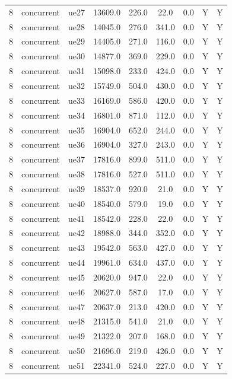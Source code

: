 \begin{table}[ht]
\begin{tabular}{|c|c|c|c|c|c|c|c|c|}
8 & concurrent & ue27 & 13609.0 & 226.0 & 22.0 & 0.0 & Y & Y \\
8 & concurrent & ue28 & 14045.0 & 276.0 & 341.0 & 0.0 & Y & Y \\
8 & concurrent & ue29 & 14405.0 & 271.0 & 116.0 & 0.0 & Y & Y \\
8 & concurrent & ue30 & 14877.0 & 369.0 & 229.0 & 0.0 & Y & Y \\
8 & concurrent & ue31 & 15098.0 & 233.0 & 424.0 & 0.0 & Y & Y \\
8 & concurrent & ue32 & 15749.0 & 504.0 & 430.0 & 0.0 & Y & Y \\
8 & concurrent & ue33 & 16169.0 & 586.0 & 420.0 & 0.0 & Y & Y \\
8 & concurrent & ue34 & 16801.0 & 871.0 & 112.0 & 0.0 & Y & Y \\
8 & concurrent & ue35 & 16904.0 & 652.0 & 244.0 & 0.0 & Y & Y \\
8 & concurrent & ue36 & 16904.0 & 327.0 & 243.0 & 0.0 & Y & Y \\
8 & concurrent & ue37 & 17816.0 & 899.0 & 511.0 & 0.0 & Y & Y \\
8 & concurrent & ue38 & 17816.0 & 527.0 & 511.0 & 0.0 & Y & Y \\
8 & concurrent & ue39 & 18537.0 & 920.0 & 21.0 & 0.0 & Y & Y \\
8 & concurrent & ue40 & 18540.0 & 579.0 & 19.0 & 0.0 & Y & Y \\
8 & concurrent & ue41 & 18542.0 & 228.0 & 22.0 & 0.0 & Y & Y \\
8 & concurrent & ue42 & 18988.0 & 344.0 & 352.0 & 0.0 & Y & Y \\
8 & concurrent & ue43 & 19542.0 & 563.0 & 427.0 & 0.0 & Y & Y \\
8 & concurrent & ue44 & 19961.0 & 634.0 & 437.0 & 0.0 & Y & Y \\
8 & concurrent & ue45 & 20620.0 & 947.0 & 22.0 & 0.0 & Y & Y \\
8 & concurrent & ue46 & 20627.0 & 587.0 & 17.0 & 0.0 & Y & Y \\
8 & concurrent & ue47 & 20637.0 & 213.0 & 420.0 & 0.0 & Y & Y \\
8 & concurrent & ue48 & 21315.0 & 541.0 & 21.0 & 0.0 & Y & Y \\
8 & concurrent & ue49 & 21322.0 & 207.0 & 168.0 & 0.0 & Y & Y \\
8 & concurrent & ue50 & 21696.0 & 219.0 & 426.0 & 0.0 & Y & Y \\
8 & concurrent & ue51 & 22341.0 & 524.0 & 227.0 & 0.0 & Y & Y \\

\end{tabular}
\end{table}
